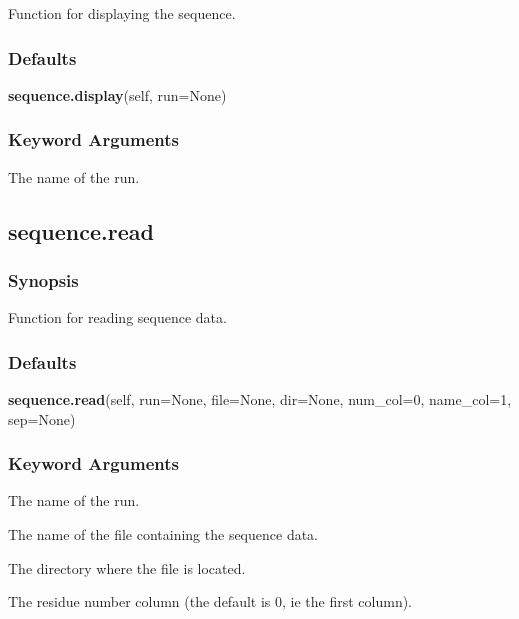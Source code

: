  Function for displaying the sequence. 
  

  
 \subsubsection{Defaults} 

 \textsf{\textbf{sequence.display}(self, run=None)} 

  
 \subsubsection{Keyword Arguments} 

   The name of the run.  

  

  

 \newpage 

 \subsection{sequence.read} 

  
 \subsubsection{Synopsis} 

 Function for reading sequence data. 
  

  
 \subsubsection{Defaults} 

 \textsf{\textbf{sequence.read}(self, run=None, file=None, dir=None, num\_col=0, name\_col=1, sep=None)} 

  
 \subsubsection{Keyword Arguments} 

   The name of the run.   

   The name of the file containing the sequence data.   

   The directory where the file is located.   

   The residue number column (the default is 0, ie the first column).   

